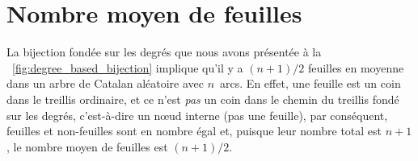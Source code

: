

\section{Nombre moyen de feuilles}

La bijection fondée sur les degrés que nous avons présentée à la
\fig~\vref{fig:degree_based_bijection} implique qu'il y a \((n+1)/2\)
feuilles en moyenne dans un arbre de Catalan aléatoire avec
\(n\)~arcs. En effet, une feuille est un coin dans le treillis
ordinaire, et ce n'est \emph{pas} un coin dans le chemin du treillis
fondé sur les degrés, c'est-à-dire un nœud interne (pas une feuille),
par conséquent, feuilles et non-feuilles sont en nombre égal et,
puisque leur nombre total est \(n+1\), le nombre moyen de feuilles est
\((n+1)/2\).

